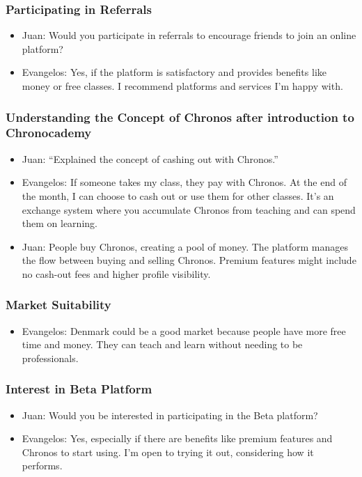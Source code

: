 \begin{enumerate}
    \subsubsection*{Participating in Referrals}
    \begin{itemize}
        \item Juan: Would you participate in referrals to encourage friends to join an online platform?
        \item Evangelos: Yes, if the platform is satisfactory and provides benefits like money or free classes.
        I recommend platforms and services I’m happy with.
    \end{itemize}

    \subsubsection*{Understanding the Concept of Chronos after introduction to Chronocademy}
    \begin{itemize}
        \item Juan: “Explained the concept of cashing out with Chronos.”
        \item Evangelos: If someone takes my class, they pay with Chronos.
        At the end of the month, I can choose to cash out or use them for other classes.
        It’s an exchange system where you accumulate Chronos from teaching and can spend them on learning.
        \item Juan: People buy Chronos, creating a pool of money.
        The platform manages the flow between buying and selling Chronos.
        Premium features might include no cash-out fees and higher profile visibility.
    \end{itemize}

    \subsubsection*{Market Suitability}
    \begin{itemize}
        \item Evangelos: Denmark could be a good market because people have more free time and money.
        They can teach and learn without needing to be professionals.
    \end{itemize}

    \subsubsection*{Interest in Beta Platform}
    \begin{itemize}
        \item Juan: Would you be interested in participating in the Beta platform?
        \item Evangelos: Yes, especially if there are benefits like premium features and Chronos to start using.
        I’m open to trying it out, considering how it performs.
    \end{itemize}


\end{enumerate}
